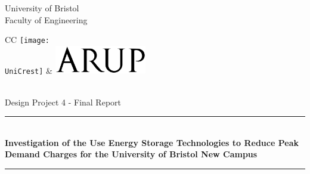 \documentclass[fontsize=9.5pt]{extarticle}
\numberwithin{figure}{section} %
\newcommand{\AssignmentTitle}{Investigation of the Use Energy Storage Technologies to Reduce Peak Demand Charges for the University of Bristol New Campus}
\newcommand{\ModuleTitle}{Design Project 4 - Final Report}
\newcommand{\University}{University of Bristol}
\newcommand{\Faculty}{Faculty of Engineering}
\newcommand{\UniCrest}{crestbris.png}
\newcommand{\horrule}[1]{\rule{\linewidth}{#1}}
\begin{document}
  \setlength{\abovedisplayskip}{-18pt}
  \setlength{\belowdisplayskip}{0pt}
  \setlength{\abovedisplayshortskip}{-18pt}
  \setlength{\belowdisplayshortskip}{0pt}



\begin{titlepage}

	\center %
		\normalfont \normalsize \University \\ [10pt]
		\normalfont \normalsize \Faculty \\ [25pt]
\begin{tabular}{CC}
  \texttt{[image: \\UniCrest]} &   \includegraphics[width=0.3\textwidth]{Arup_logo.png}
\end{tabular}\\[0.5cm]
		\normalfont \normalsize \ModuleTitle \\ [25pt]
		\horrule{0.5pt} \\[0.4cm]
		\huge \textbf{\AssignmentTitle} \\
		\horrule{2pt} \\[0.5cm]

\end{titlepage}
\end{document}
